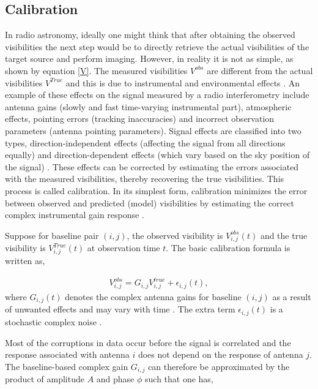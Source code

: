 \subsection{Calibration}
\label{Calib}
In radio astronomy, ideally one might think that after obtaining the observed visibilities the next step would be to directly retrieve the actual visibilities of the target source and perform imaging. However, in reality it is not as simple, as shown by equation \ref{V}. The measured visibilities $V^{obs}$ are different from the actual visibilities $V^{True}$ and this is due to instrumental and environmental effects \citep{thompson2017interferometry}. An example of these effects on the signal measured by a radio interferometry include antenna gains (slowly and fast time-varying instrumental part), atmospheric effects, pointing errors (tracking inaccuracies) and incorrect observation parameters (antenna pointing parameters). Signal effects are classified into two types, direction-independent effects (affecting the signal from all directions equally) and direction-dependent effects (which vary based on the sky position of the signal) \citep{taylor1999synthesis}. These effects can be corrected by estimating the errors associated with the measured visibilities, thereby recovering the true visibilities. This process is called calibration. In its simplest form, calibration minimizes the error between observed and predicted (model) visibilities by estimating the correct complex instrumental gain response \citep{grobler2016calibration}. 

Suppose for baseline pair $(i,j)$, the observed visibility is $V^{obs}_{i,j}(t)$ and the true visibility is $V^{True}_{i,j}(t)$ at observation time $t$. The basic calibration formula is written as,

\begin{align}
V_{i,j}^{obs}=G_{i,j} V_{i,j}^{true} + \epsilon_{i,j}(t) ,
\end{align}
where $G_{i,j}(t)$ denotes the complex antenna gains for baseline $(i,j)$ as a result of unwanted effects and may vary with time \citep{thompson2001interferometry}. The extra term $ \epsilon_{i,j}(t)$ is a stochastic complex noise \citep{taylor1999synthesis}.

Most of the corruptions in data occur before the signal is correlated and the response associated with antenna  $i$  does not depend on the response of antenna $j$. The baseline-based complex gain $G_{i,j}$ can therefore be approximated by the product of amplitude $A$ and phase $\phi$ such that one has,  

